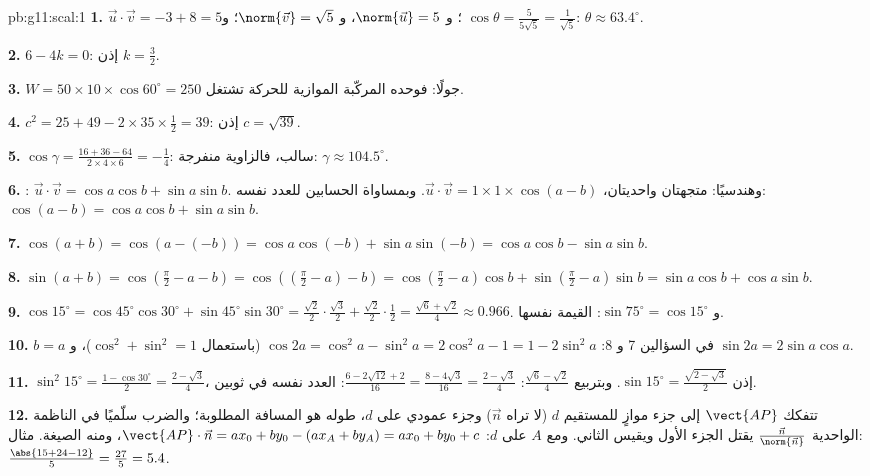\begin{solution}{pb:g11:scal:1}
\textbf{1.} $\vec u \cdot \vec v = -3 + 8 = 5$؛
و $\norm{\vec u} = 5$، و $\norm{\vec v} = \sqrt5$؛
و $\cos\theta = \frac{5}{5\sqrt5} = \frac{1}{\sqrt5}$:
$\theta \approx 63.4^\circ$.

\textbf{2.} $6 - 4k = 0$: إذن $k = \frac32$.

\textbf{3.} $W = 50 \times 10 \times \cos 60^\circ = 250$
جولًا: فوحده المركّبة الموازية للحركة تشتغل.

\textbf{4.} $c^2 = 25 + 49 - 2 \times 35 \times \frac12 = 39$:
إذن $c = \sqrt{39}$.

\textbf{5.} $\cos\gamma = \frac{16 + 36 - 64}{2 \times 4
\times 6} = -\frac14$: سالب، فالزاوية منفرجة:
$\gamma \approx 104.5^\circ$.

\textbf{6.} : $\vec u \cdot \vec v = \cos a \cos b +
\sin a \sin b$. وهندسيًا: متجهتان واحديتان،
$\vec u \cdot \vec v = 1 \times 1 \times \cos(a - b)$.
وبمساواة الحسابين للعدد نفسه:
$\cos(a - b) = \cos a \cos b + \sin a \sin b$.

\textbf{7.} $\cos(a + b) = \cos(a - (-b)) = \cos a \cos(-b) +
\sin a \sin(-b) = \cos a \cos b - \sin a \sin b$.

\textbf{8.} $\sin(a + b) = \cos\left(\frac\pi2 - a - b\right)
= \cos\left(\left(\frac\pi2 - a\right) - b\right)
= \cos\left(\frac\pi2 - a\right)\cos b +
\sin\left(\frac\pi2 - a\right)\sin b
= \sin a \cos b + \cos a \sin b$.

\textbf{9.} $\cos 15^\circ = \cos 45^\circ \cos 30^\circ +
\sin 45^\circ \sin 30^\circ = \frac{\sqrt2}{2} \cdot
\frac{\sqrt3}{2} + \frac{\sqrt2}{2} \cdot \frac12 =
\frac{\sqrt6 + \sqrt2}{4} \approx 0.966$. و
$\sin 75^\circ = \cos 15^\circ$: القيمة نفسها.

\textbf{10.} $b = a$ في السؤالين 7 و 8:
$\cos 2a = \cos^2 a - \sin^2 a = 2\cos^2 a - 1 = 1 - 2\sin^2 a$
(باستعمال $\cos^2 + \sin^2 = 1$)، و
$\sin 2a = 2 \sin a \cos a$.

\textbf{11.} $\sin^2 15^\circ = \frac{1 - \cos 30^\circ}{2}
= \frac{2 - \sqrt3}{4}$، إذن
$\sin 15^\circ = \frac{\sqrt{2 - \sqrt3}}{2}$. وبتربيع
$\frac{\sqrt6 - \sqrt2}{4}$:
$\frac{6 - 2\sqrt{12} + 2}{16} = \frac{8 - 4\sqrt3}{16} =
\frac{2 - \sqrt3}{4}$: العدد نفسه في ثوبين.

\textbf{12.} تتفكك $\vect{AP}$ إلى جزء موازٍ للمستقيم $d$
(لا تراه $\vec n$) وجزء عمودي على $d$، طوله هو
المسافة المطلوبة؛ والضرب سلّميًا في  الناظمة الواحدية
$\frac{\vec n}{\norm{\vec n}}$ يقتل الجزء الأول
ويقيس الثاني. ومع $A$ على $d$:
$\vect{AP} \cdot \vec n = a x_0 + b y_0 - (a x_A + b y_A) =
a x_0 + b y_0 + c$، ومنه الصيغة. مثال:
$\frac{\abs{15 + 24 - 12}}{5} = \frac{27}{5} = 5.4$.


\end{solution}
